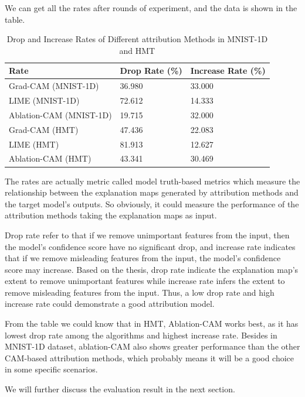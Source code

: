 \documentclass[conference]{IEEEtran}
\begin{document}
We can get all the rates after rounds of experiment, and the data is shown in the table.

\begin{table}[h]
\caption{Drop and Increase Rates of Different attribution Methods in MNIST-1D and HMT}
\begin{tabular}{|l|l|l|}
\hline
Rate                    & Drop Rate (\%) & Increase Rate (\%) \\ \hline
Grad-CAM (MNIST-1D)     & 36.980         & 33.000             \\ \hline
LIME (MNIST-1D)   & 72.612         & 14.333             \\ \hline
Ablation-CAM (MNIST-1D) & 19.715         & 32.000             \\ \hline
Grad-CAM (HMT)          & 47.436         & 22.083             \\ \hline
LIME (HMT)        & 81.913         & 12.627             \\ \hline
Ablation-CAM (HMT)      & 43.341         & 30.469             \\ \hline
\end{tabular}
\end{table}

The rates are actually metric called model truth-based metrics which measure the relationship between the explanation maps generated by attribution methods and the target model's outputs. So obviously, it could measure the performance of the attribution methods taking the explanation maps as input.\par
Drop rate refer to that if we remove unimportant features from the input, then the model's confidence score have no significant drop, and increase rate indicates that if we remove misleading features from the input, the model's confidence score may increase. Based on the thesis, drop rate indicate the explanation map's extent to remove unimportant features while increase rate infers the extent to remove misleading features from the input. Thus, a low drop rate and high increase rate could demonstrate a good attribution model.\par
From the table we could know that in HMT, Ablation-CAM works best, as it has lowest drop rate among the algorithms and highest increase rate. Besides in MNIST-1D dataset, ablation-CAM also shows greater performance than the other CAM-based attribution methods, which probably means it will be a good choice in some specific scenarios.\par
We will further discuss the evaluation result in the next section.
\end{document}
